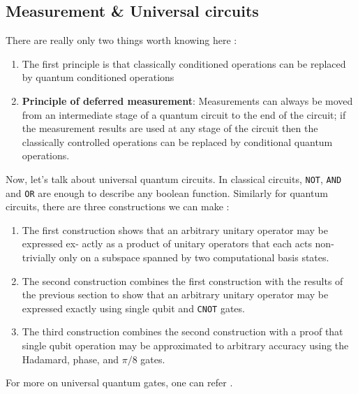 \documentclass[conference]{IEEEtran}
\begin{document}
\subsection{Measurement \& Universal circuits}

There are really only two things worth knowing here : 
\begin{enumerate}
    \item The ﬁrst principle is that classically conditioned operations 
    can be replaced by quantum conditioned operations
    \item \textbf{Principle of deferred measurement}: Measurements can always be moved from
    an intermediate stage of a quantum circuit to the end of the circuit; if the
    measurement results are used at any stage of the circuit then the classically
    controlled operations can be replaced by conditional quantum operations.
\end{enumerate}

Now, let's talk about universal quantum circuits. In classical circuits, \verb|NOT|, \verb|AND| and \verb|OR| are 
enough to describe any boolean function. Similarly for quantum circuits, there are three constructions we can make : 
\begin{enumerate}
    \item The ﬁrst construction shows that an arbitrary unitary operator may be expressed ex-
    actly as a product of unitary operators that each acts non-trivially only on a subspace
    spanned by two computational basis states.
    \item The second construction combines the ﬁrst
    construction with the results of the previous section to show that an arbitrary unitary
    operator may be expressed exactly using single qubit and \verb|CNOT| gates.
    \item The third construction combines the second construction with a proof that single qubit operation may
    be approximated to arbitrary accuracy using the Hadamard, phase, and $\pi/8$ gates.
\end{enumerate}

For more on universal quantum gates, one can refer \cite{b2}. 
\end{document}
